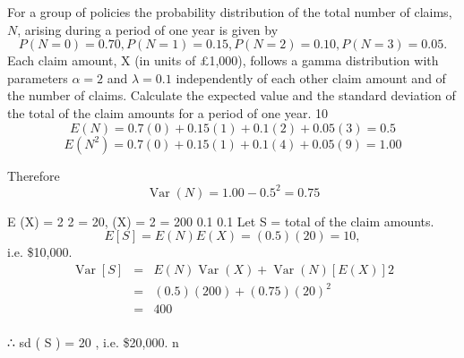 \documentclass[a4paper,12pt]{article}
\begin{document}
\noindent For a group of policies the probability distribution of the total number of claims, $N$, arising during a period of one year is given by
\[P(N = 0) = 0.70, P(N = 1) = 0.15, P(N = 2) = 0.10, P(N = 3) = 0.05.\]
Each claim amount, X (in units of £1,000), follows a gamma distribution with parameters $\alpha = 2$ and $\lambda = 0.1$ independently of each other claim amount and of the number of claims.
Calculate the expected value and the standard deviation of the total of the claim
amounts for a period of one year.
10
\[E ( N ) = 0.7(0) + 0.15(1) + 0.1(2) + 0.05(3) = 0.5\]
\[E ( N^2 ) = 0.7(0) + 0.15(1) + 0.1(4) + 0.05(9) = 1.00 \] 

\noindent Therefore \[\operatorname{Var} (N) = 1.00 − 0.5^2 = 0.75\]

E (X) =
2
2
= 20,  (X) = 2 = 200
0.1
0.1
Let S = total of the claim amounts.
\[E [ S ] = E (N) E (X) = (0.5)(20) = 10 ,\] i.e. \$10,000.
\begin{eqnarray*}
\operatorname{Var} [ S ] &=& E (N) \operatorname{Var} (X) + \operatorname{Var} (N) [ E ( X )] 2 \\
&=& (0.5)(200) + (0.75)(20)^2\\ 
&=& 400\\
\end{eqnarray*}


∴ sd ( S ) = 20 , i.e. \$20,000.
n
\end{document}
